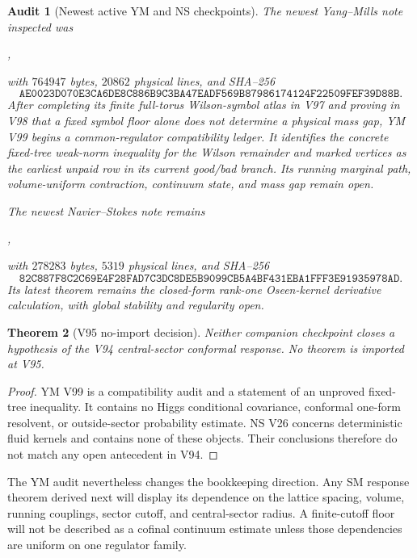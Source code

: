 \documentclass[11pt]{article}
\newtheorem{theorem}{Theorem}[section]
\newtheorem{audit}[theorem]{Audit}
\theoremstyle{remark}
\begin{document}
\begin{audit}[Newest active YM and NS checkpoints]
\label{aud:v17v95-companions}
The newest Yang--Mills note inspected was
\begin{center}\footnotesize
{},
\end{center}
with \(764947\) bytes, \(20862\) physical lines, and SHA--256
\[
 \texttt{AE0023D070E3CA6DE8C886B9C3BA47EADF569B87986174124F22509FEF39D88B}.
\]
After completing its finite full-torus Wilson-symbol atlas in V97 and
proving in V98 that a fixed symbol floor alone does not determine a
physical mass gap, YM V99 begins a common-regulator compatibility
ledger.  It identifies the concrete fixed-tree weak-norm inequality
for the Wilson remainder and marked vertices as the earliest unpaid
row in its current good/bad branch.  Its running marginal path,
volume-uniform contraction, continuum state, and mass gap remain open.

The newest Navier--Stokes note remains
\begin{center}\footnotesize
{},
\end{center}
with \(278283\) bytes, \(5319\) physical lines, and SHA--256
\[
 \texttt{82C887F8C2C69E4F28FAD7C3DC8DE5B9099CB5A4BF431EBA1FFF3E91935978AD}.
\]
Its latest theorem remains the closed-form rank-one Oseen-kernel
derivative calculation, with global stability and regularity open.
\end{audit}

\begin{theorem}[V95 no-import decision]
\label{thm:v17v95-no-import}
Neither companion checkpoint closes a hypothesis of the V94
central-sector conformal response.  No theorem is imported at V95.
\end{theorem}

\begin{proof}
YM V99 is a compatibility audit and a statement of an unproved
fixed-tree inequality.  It contains no Higgs conditional covariance,
conformal one-form resolvent, or outside-sector probability estimate.
NS V26 concerns deterministic fluid kernels and contains none of
these objects.  Their conclusions therefore do not match any open
antecedent in V94.
\end{proof}

The YM audit nevertheless changes the bookkeeping direction.  Any SM
response theorem derived next will display its dependence on the
lattice spacing, volume, running couplings, sector cutoff, and
central-sector radius.  A finite-cutoff floor will not be described as
a cofinal continuum estimate unless those dependencies are uniform on
one regulator family.
\end{document}
